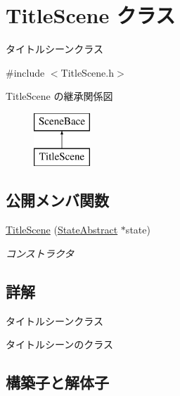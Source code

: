 \hypertarget{class_title_scene}{}\section{Title\+Scene クラス}
\label{class_title_scene}


タイトルシーンクラス  




{\ttfamily \#include $<$Title\+Scene.\+h$>$}

Title\+Scene の継承関係図\begin{figure}[H]
\begin{center}
\leavevmode
\includegraphics[height=2.000000cm]{class_title_scene}
\end{center}
\end{figure}
\subsection*{公開メンバ関数}
\begin{DoxyCompactItemize}
\item 
\mbox{\hyperlink{class_title_scene_ab750104d538a0a82c5bfa22f8d917e4e}{Title\+Scene}} (\mbox{\hyperlink{class_scene_bace_1_1_state_abstract}{State\+Abstract}} $\ast$state)
\begin{DoxyCompactList}\small\item\em コンストラクタ \end{DoxyCompactList}\end{DoxyCompactItemize}


\subsection{詳解}
タイトルシーンクラス 

タイトルシーンのクラス 

\subsection{構築子と解体子}
\mbox{\label{class_title_scene_ab750104d538a0a82c5bfa22f8d917e4e}} 
